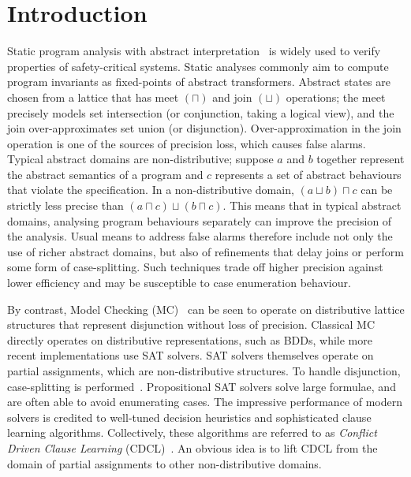 \section{Introduction}

%
Static program analysis with abstract interpretation~\cite{CC77} is widely
used to verify properties of safety-critical systems.  Static analyses
commonly aim to compute program invariants as fixed-points of abstract
transformers.  Abstract states are chosen from a lattice that has meet
$(\sqcap)$ and join $(\sqcup)$ operations; the meet precisely models set
intersection (or conjunction, taking a logical view), and the join
over-approximates set union (or disjunction).  Over-approximation in the
join operation is one of the sources of precision loss, which causes false
alarms.  Typical abstract domains are non-distributive; suppose $a$ and $b$
together represent the abstract semantics of a program and $c$ represents a
set of abstract behaviours that violate the specification.  In a
non-distributive domain, $(a \sqcup b) \sqcap c$ can be strictly less
precise than $(a \sqcap c) \sqcup (b \sqcap c)$.  This means that in typical
abstract domains, analysing program behaviours separately can improve the
precision of the analysis.  Usual means to address false alarms therefore
include not only the use of richer abstract domains, but also of refinements
that delay joins or perform some form of case-splitting.  Such techniques
trade off higher precision against lower efficiency and may be susceptible
to case enumeration behaviour.

By contrast, Model Checking (MC)~\cite{mc-book} can be seen to operate on
distributive lattice structures that represent disjunction without loss
of precision.  Classical MC directly operates on distributive
representations, such as BDDs, while more recent implementations use SAT
solvers.  SAT solvers themselves operate on partial assignments, which are
non-distributive structures.  To handle disjunction, case-splitting is
performed~\cite{sas12}.  Propositional SAT solvers solve large formulae, and
are often able to avoid enumerating cases.  The impressive performance of
modern solvers is credited to well-tuned decision heuristics and
sophisticated clause learning algorithms.  Collectively, these algorithms
are referred to as \emph{Conflict Driven Clause Learning}
(CDCL)~\cite{cdcl}.  An obvious idea is to lift CDCL from the domain of 
partial assignments to other non-distributive domains.

